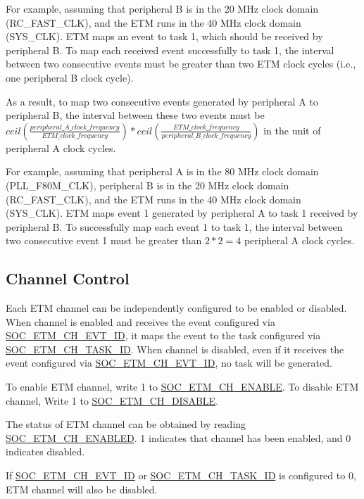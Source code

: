 \documentclass[main\_\_EN.tex]{subfiles}
\begin{document}
For example, assuming that peripheral B is in the 20 MHz clock domain (RC\_FAST\_CLK), and the ETM runs in the 40 MHz clock domain (SYS\_CLK). ETM maps an event to task 1, which should be received by peripheral B. To map each received event successfully to task 1, the interval between two consecutive events must be greater than two ETM clock cycles (i.e., one peripheral B clock cycle).

As a result, to map two consecutive events generated by peripheral A to peripheral B, the interval between these two events must be $ceil(\frac{peripheral\_A\_clock\_frequency}{ETM\_clock\_frequency})*ceil(\frac{ETM\_clock\_frequency}{peripheral\_B\_clock\_frequency})$ in the unit of peripheral A clock cycles.

For example, assuming that peripheral A is in the 80 MHz clock domain (PLL\_F80M\_CLK), peripheral B is in the 20 MHz clock domain (RC\_FAST\_CLK), and the ETM runs in the 40 MHz clock domain (SYS\_CLK). ETM maps event 1 generated by peripheral A to task 1 received by peripheral B. To successfully map each event 1 to task 1, the interval between two consecutive event 1 must be greater than $2*2=4$ peripheral A clock cycles.


\subsection{Channel Control}
\label{sec:evntaskmatrix-channel-enable}
Each ETM channel can be independently configured to be enabled or disabled. When channel is enabled and receives the event configured via \hyperref[fielddesc:SOCETMCH0EVTID]{SOC\_ETM\_CH\_EVT\_ID}, it maps the event to the task configured via \hyperref[fielddesc:SOCETMCH0TASKID]{SOC\_ETM\_CH\_TASK\_ID}. When channel is disabled, even if it receives the event configured via \hyperref[fielddesc:SOCETMCH0EVTID]{SOC\_ETM\_CH\_EVT\_ID}, no task will be generated.

To enable ETM channel, write 1 to \hyperref[fielddesc:SOCETMCHENABLE0]{SOC\_ETM\_CH\_ENABLE}. To disable ETM channel, Write 1 to \hyperref[fielddesc:SOCETMCHDISABLE0]{SOC\_ETM\_CH\_DISABLE}.

The status of ETM channel can be obtained by reading \hyperref[fielddesc:SOCETMCHENABLED0]{SOC\_ETM\_CH\_ENABLED}. 1 indicates that channel has been enabled, and 0 indicates disabled.

If \hyperref[fielddesc:SOCETMCH0EVTID]{SOC\_ETM\_CH\_EVT\_ID} or  \hyperref[fielddesc:SOCETMCH0TASKID]{SOC\_ETM\_CH\_TASK\_ID} is configured to 0, ETM channel will also be disabled.
\end{document}
